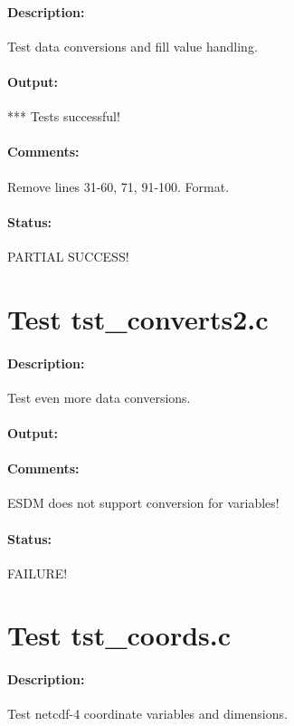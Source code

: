 \paragraph{Description:} Test data conversions and fill value handling.

\paragraph{Output:} *** Tests successful!

\paragraph{Comments:} Remove lines 31-60, 71, 91-100. Format.

\paragraph{Status:} PARTIAL SUCCESS!

\section{Test tst\_converts2.c}

\paragraph{Description:} Test even more data conversions.

\paragraph{Output:}

\paragraph{Comments:} ESDM does not support conversion for variables!

\paragraph{Status:} FAILURE!

{\color{blue}{Help, Julian!}}

\section{Test tst\_coords.c}

\paragraph{Description:} Test netcdf-4 coordinate variables and dimensions.

